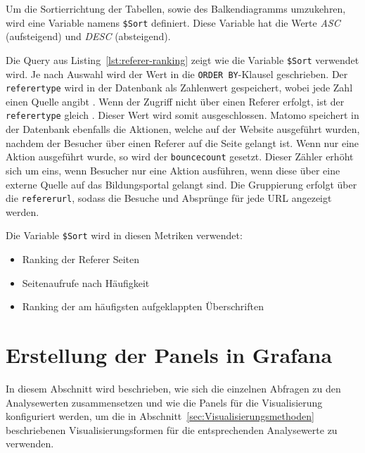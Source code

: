 Um die Sortierrichtung der Tabellen, sowie des Balkendiagramms umzukehren, wird eine Variable namens \texttt{\$Sort} definiert. Diese Variable hat die Werte \textit{ASC} (aufsteigend) und \textit{DESC} (absteigend).

\begin{figure}[H]
    \centering
    \begin{minipage}{\textwidth}
        
    \end{minipage}
\end{figure}

Die Query aus Listing~\ref{lst:referer-ranking} zeigt wie die Variable \texttt{\$Sort} verwendet wird. Je nach Auswahl wird der Wert in die {\texttt{ORDER BY}-Klausel} geschrieben. Der \texttt{referer\textunderscore type} wird in der Datenbank als Zahlenwert gespeichert, wobei jede Zahl einen Quelle angibt \parencite{MatomoDBSchema}. Wenn der Zugriff nicht über einen Referer erfolgt, ist der \texttt{referer\textunderscore type} gleich \grqq{}. Dieser Wert wird somit ausgeschlossen. Matomo speichert in der Datenbank ebenfalls die Aktionen, welche auf der Website ausgeführt wurden, nachdem der Besucher über einen Referer auf die Seite gelangt ist. Wenn nur eine Aktion ausgeführt wurde, so wird der \texttt{bounce\textunderscore count} gesetzt. Dieser Zähler erhöht sich um eins, wenn Besucher nur eine Aktion ausführen, wenn diese über eine externe Quelle auf das Bildungsportal gelangt sind. Die Gruppierung erfolgt über die \texttt{referer\textunderscore url}, sodass die Besuche und Absprünge für jede URL angezeigt werden. 

Die Variable \texttt{\$Sort} wird in diesen Metriken verwendet: 
\begin{itemize}
    \item Ranking der Referer Seiten
    \item Seitenaufrufe nach Häufigkeit
    \item Ranking der am häufigsten aufgeklappten Überschriften
\end{itemize}

\section{Erstellung der Panels in Grafana}
In diesem Abschnitt wird beschrieben, wie sich die einzelnen Abfragen zu den Analysewerten zusammensetzen und wie die Panels für die Visualisierung konfiguriert werden, um die in Abschnitt~\ref{sec:Visualisierungsmethoden} beschriebenen Visualisierungsformen für die entsprechenden Analysewerte zu verwenden. 

